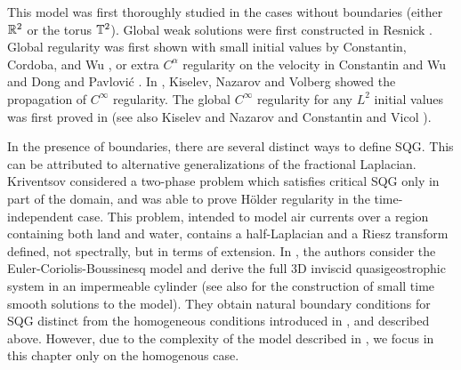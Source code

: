\begin{theorem}
\end{theorem}

This model was first thoroughly studied in the cases without boundaries (either $\mathbb{R}^2$ or the torus $\mathbb{T}^2$).   
Global weak solutions were first constructed in Resnick \cite{Re}. Global regularity was first shown with small initial values by Constantin, Cordoba, and Wu \cite{CoCoWu}, or extra $C^\alpha$ regularity on the velocity in Constantin and Wu \cite{CoWu} and Dong and Pavlovi\'{c} \cite{DoPa}. In \cite{KiNaVo}, Kiselev, Nazarov and Volberg showed the 
propagation of $C^\infty$ regularity. The global $C^\infty$ regularity for any $L^2$ initial values was first proved in  \cite{CaVa.sqg} (see also Kiselev and Nazarov \cite{KiNa.variations} and Constantin and Vicol \cite{CoVi}).   

\vskip0.3cm

In the presence of boundaries, there are several  distinct ways to define SQG. This can be attributed  to alternative generalizations of the fractional Laplacian.  Kriventsov \cite{Kr.landsea} considered a two-phase problem which satisfies critical SQG only in part of the domain, and was able to prove H\"{o}lder regularity in the time-independent case.  This problem, intended to model air currents over a region containing both land and water, contains a half-Laplacian and a Riesz transform defined, not spectrally, but in terms of extension.  In \cite{NoVa.bounded}, the authors consider the Euler-Coriolis-Boussinesq model and derive the full 3D inviscid quasigeostrophic system in an impermeable cylinder (see also \cite{NoVa.solutions} for the construction of small time smooth solutions to the model).  They obtain natural boundary conditions for SQG distinct from the homogeneous conditions introduced in \cite{CoIg.fraclap}, \cite{CoIg.sqg} and described above. 
However, due to the complexity of the model described in \cite{NoVa.bounded}, we focus in this chapter only on the homogenous case.

